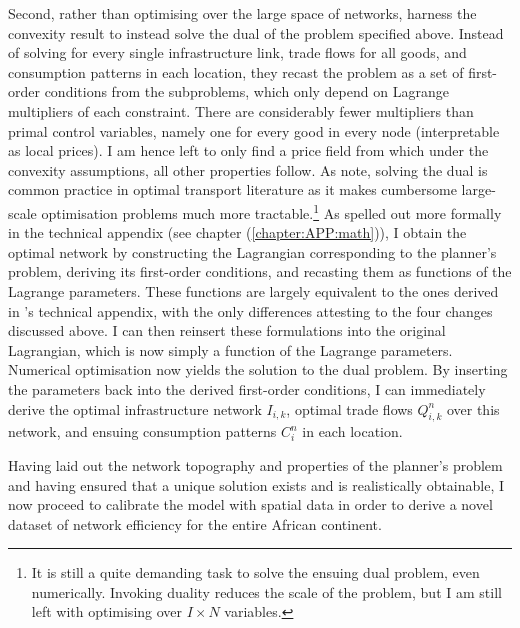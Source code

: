 \documentclass[11pt, oneside]{article}   	%
\let\oldref\ref
\renewcommand{\ref}[1]{(\oldref{#1})}
\begin{document}
Second, rather than optimising over the large space of networks, \citeauthor{Fajgelbaum_OptimalTransportNetworks_2017} harness the convexity result to instead solve the dual of the problem specified above. Instead of solving for every single infrastructure link, trade flows for all goods, and consumption patterns in each location, they recast the problem as a set of first-order conditions from the subproblems, which only depend on Lagrange multipliers of each constraint. There are considerably fewer multipliers than primal control variables, namely one for every good in every node (interpretable as local prices). I am hence left to only find a price field from which under the convexity assumptions, all other properties follow. As \citeauthor{Fajgelbaum_OptimalTransportNetworks_2017} note, solving the dual is common practice in optimal transport literature as it makes cumbersome large-scale optimisation problems much more tractable.\footnote{It is still a quite demanding  task to solve the ensuing dual problem, even numerically. Invoking duality reduces the scale of the problem, but I am still left with optimising over $I \times N$ variables.} As spelled out more formally in the technical appendix (see chapter \ref{chapter:APP:math}), I obtain the optimal network by constructing the Lagrangian corresponding to the planner's problem, deriving its first-order conditions, and recasting them as functions of the Lagrange parameters. These functions are largely equivalent to the ones derived in \citeauthor{Fajgelbaum_OptimalTransportNetworks_2017}'s technical appendix, with the only differences attesting to the four changes discussed above. I can then reinsert these formulations into the original Lagrangian, which is now simply a function of the Lagrange parameters. Numerical optimisation now yields the solution to the dual problem. By inserting the parameters back into the derived first-order conditions, I can immediately derive the optimal infrastructure network $I_{i,k}$, optimal trade flows $Q_{i,k}^{n}$ over this network, and ensuing consumption patterns $C_{i}^{n}$ in each location.

Having laid out the network topography and properties of the planner's problem and having ensured that a unique solution exists and is realistically obtainable, I now proceed to calibrate the model with spatial data in order to derive a novel dataset of network efficiency for the entire African continent.
\end{document}
